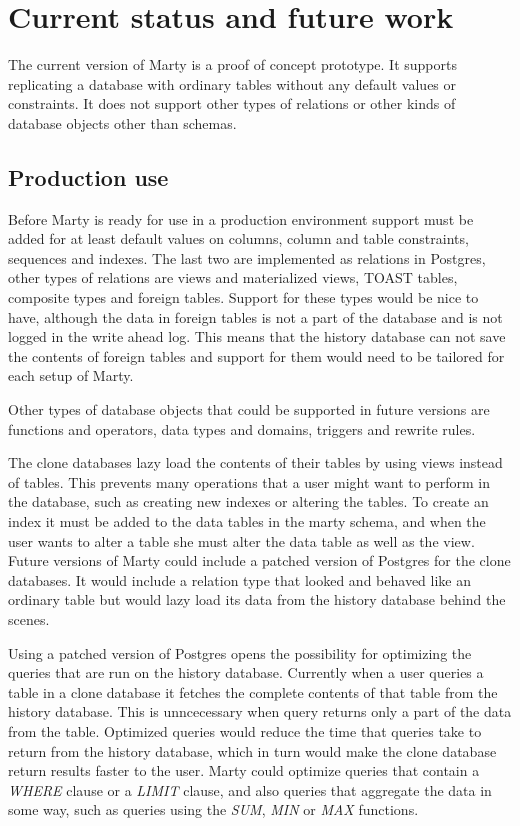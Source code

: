 \chapter{Current status and future work}
\label{ch:current-status}
The current version of Marty is a proof of concept prototype.
It supports replicating a database with ordinary tables without any default values or constraints.
It does not support other types of relations or other kinds of database objects other than schemas.

\section{Production use}
Before Marty is ready for use in a production environment support must be added for at least default values on columns, column and table constraints, sequences and indexes.
The last two are implemented as relations in Postgres, other types of relations are views and materialized views, TOAST tables, composite types and foreign tables.
Support for these types would be nice to have, although the data in foreign tables is not a part of the database and is not logged in the write ahead log.
This means that the history database can not save the contents of foreign tables and support for them would need to be tailored for each setup of Marty.

Other types of database objects that could be supported in future versions are functions and operators, data types and domains, triggers and rewrite rules.

The clone databases lazy load the contents of their tables by using views instead of tables.
This prevents many operations that a user might want to perform in the database, such as creating new indexes or altering the tables.
To create an index it must be added to the data tables in the marty schema, and when the user wants to alter a table she must alter the data table as well as the view.
Future versions of Marty could include a patched version of Postgres for the clone databases.
It would include a relation type that looked and behaved like an ordinary table but would lazy load its data from the history database behind the scenes.

Using a patched version of Postgres opens the possibility for optimizing the queries that are run on the history database.
Currently when a user queries a table in a clone database it fetches the complete contents of that table from the history database.
This is unncecessary when query returns only a part of the data from the table.
Optimized queries would reduce the time that queries take to return from the history database, which in turn would make the clone database return results faster to the user.
Marty could optimize queries that contain a \textit{WHERE} clause or a \textit{LIMIT} clause, and also queries that aggregate the data in some way, such as queries using the \textit{SUM}, \textit{MIN} or \textit{MAX} functions.

